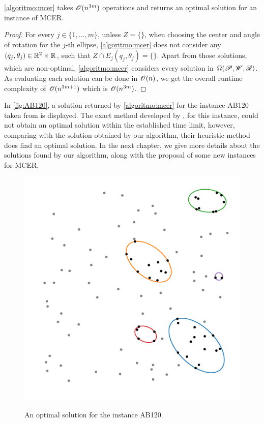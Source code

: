 \begin{corolario}
	\autoref{algoritmo:mcer} takes $\mathscr{O}(n^{3m})$ operations and returns an optimal solution for an instance of MCER.
\end{corolario}

\begin{proof}
	For every $j\in\{1, \dots, m\}$, unless $Z=\{\}$, when choosing the center and angle of rotation for the $j$-th ellipse, \autoref{algoritmo:mcer} does not consider any $(q_j, \theta_j) \in \mathbb{R}^2 \times \mathbb{R}$, such that $Z \cap E_j(q_j, \theta_j) = \{\}$. Apart from those solutions, which are non-optimal, \autoref{algoritmo:mcer} considers every solution in $\Omega(\mathscr{P}, \mathscr{W}, \mathscr{R})$. As evaluating each solution can be done in $\mathscr{O}(n)$, we get the overall runtime complexity of $\mathscr{O}(n^{3m+1})$ which is $\mathscr{O}(n^{3m})$.
\end{proof}

In \autoref{fig:AB120}, a solution returned by \autoref{algoritmo:mcer} for the instance AB120 taken from  is displayed. The exact method developed by , for this instance, could not obtain an optimal solution within the established time limit, however, comparing with the solution obtained by our algorithm, their heuristic method does find an optimal solution. In the next chapter, we give more details about the solutions found by our algorithm, along with the proposal of some new instances for MCER.


\begin{figure}[!htb]
	\centering
	\caption{An optimal solution for the instance AB120.}
	\includegraphics[scale=.5]{tex/figures/AB120}
	\fautor
	\label{fig:AB120}
\end{figure}

